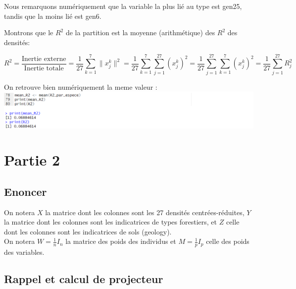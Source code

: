 \documentclass{article}
\begin{document}
Nous remarquons numériquement que la variable la plus lié au type est gen25, tandis que la moins lié est gen6.

Montrons que le $R^2$ de la partition est la moyenne (arithmétique) des $R^2$ des densités:

\[
R^2 = \frac{\text{Inertie externe}}{\text{Inertie totale}}
= \frac{1}{27} \sum_{k=1}^{7} \lVert x_j^k \rVert^2
= \frac{1}{27} \sum_{k=1}^{7} \sum_{j=1}^{27} (x_j^k)^2
= \frac{1}{27} \sum_{j=1}^{27} \sum_{k=1}^{7} (x_j^k)^2
= \frac{1}{27} \sum_{j=1}^{27} R_j^2
\]

On retrouve bien numériquement la meme valeur :
\\
\includegraphics[width=1.5\textwidth]{preuve_info_p1.png}

\newpage
\section{Partie 2}
\subsection{Enoncer}
On notera $X$ la matrice dont les colonnes sont les 27 densités centrées-réduites, $Y$ la
matrice dont les colonnes sont les indicatrices de types forestiers, et $Z$ celle dont les
colonnes sont les indicatrices de sols (geology). \\
On notera $W=\frac{1}{n}I_n$ la matrice des poids des individus et $M=\frac{1}{p}I_p$
celle des poids des variables.
\subsection{Rappel et calcul de projecteur}
\end{document}

